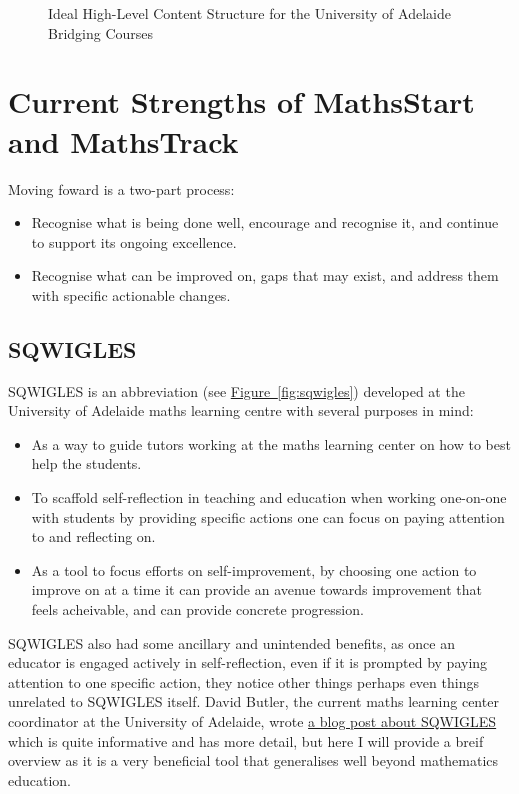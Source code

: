 \documentclass[twoside,12pt,a4paper]{report}
\newcommand{\reffig}[1]{\hyperref[fig:#1]{Figure~\ref{fig:#1}}}
\begin{document}
\begin{figure}
\begin{center}
\end{center}
\caption{Ideal High-Level Content Structure for the University of Adelaide Bridging Courses \label{fig:contentStructure}}
\end{figure}


\section{Current Strengths of MathsStart and MathsTrack}

Moving foward is a two-part process:
\begin{itemize}
	\item Recognise what is being done well, encourage and recognise it, and continue to support its ongoing excellence.
	\item Recognise what can be improved on, gaps that may exist, and address them with specific actionable changes.
\end{itemize}

\subsection{SQWIGLES}

SQWIGLES is an abbreviation (see \reffig{sqwigles}) developed at the University of Adelaide maths learning centre with several purposes in mind:
\begin{itemize}
	\item As a way to guide tutors working at the maths learning center on how to best help the students.
	\item To scaffold self-reflection in teaching and education when working one-on-one with students by providing specific actions one can focus on paying attention to and reflecting on.
	\item As a tool to focus efforts on self-improvement, by choosing one action to improve on at a time it can provide an avenue towards improvement that feels acheivable, and can provide concrete progression.
\end{itemize}
SQWIGLES also had some ancillary and unintended benefits, as once an educator is engaged actively in self-reflection, even if it is prompted by paying attention to one specific action, they notice other things perhaps even things unrelated to SQWIGLES itself. David Butler, the current maths learning center coordinator at the University of Adelaide, wrote \href{https://blogs.adelaide.edu.au/maths-learning/2016/09/20/sqwigles/}{a blog post about SQWIGLES} which is quite informative and has more detail, but here I will provide a breif overview as it is a very beneficial tool that generalises well beyond mathematics education.
\end{document}
